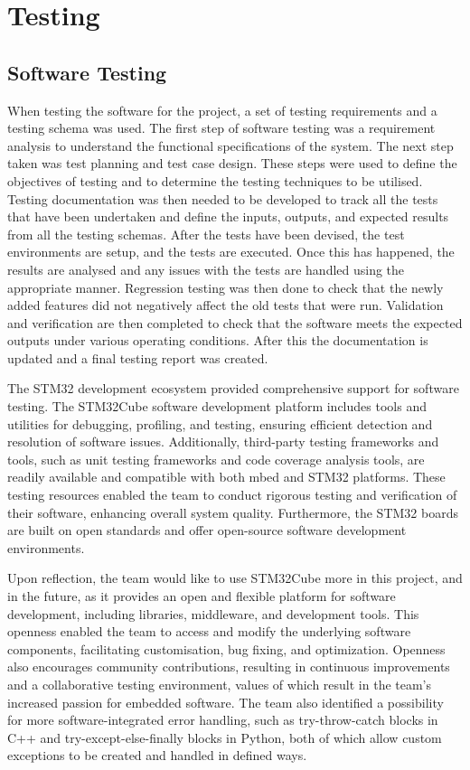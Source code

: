 \documentclass [12pt]{article}
\begin{document}
\newpage
\section{Testing}

\subsection{Software Testing}
When testing the software for the project, a set of testing requirements and a testing schema was used. The first step of software testing was a requirement analysis to understand the functional specifications of the system. The next step taken was test planning and test case design. These steps were used to define the objectives of testing and to determine the testing techniques to be utilised. Testing documentation was then needed to be developed to track all the tests that have been undertaken and define the inputs, outputs, and expected results from all the testing schemas. After the tests have been devised, the test environments are setup, and the tests are executed. Once this has happened, the results are analysed and any issues with the tests are handled using the appropriate manner.  Regression testing was then done to check that the newly added features did not negatively affect the old tests that were run. Validation and verification are then completed to check that the software meets the expected outputs under various operating conditions. After this the documentation is updated and a final testing report was created. 

The STM32 development ecosystem provided comprehensive support for software testing. The STM32Cube software development platform includes tools and utilities for debugging, profiling, and testing, ensuring efficient detection and resolution of software issues. Additionally, third-party testing frameworks and tools, such as unit testing frameworks and code coverage analysis tools, are readily available and compatible with both mbed and STM32 platforms. These testing resources enabled the team to conduct rigorous testing and verification of their software, enhancing overall system quality. Furthermore, the STM32 boards are built on open standards and offer open-source software development environments.  

Upon reflection, the team would like to use STM32Cube more in this project, and in the future, as it provides an open and flexible platform for software development, including libraries, middleware, and development tools. This openness enabled the team to access and modify the underlying software components, facilitating customisation, bug fixing, and optimization. Openness also encourages community contributions, resulting in continuous improvements and a collaborative testing environment, values of which result in the team’s increased passion for embedded software.
The team also identified a possibility for more software-integrated error handling, such as try-throw-catch blocks in C++ and try-except-else-finally blocks in Python, both of which allow custom exceptions to be created and handled in defined ways.
\end{document}
